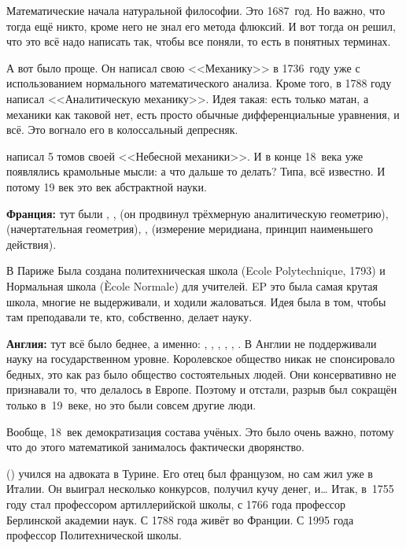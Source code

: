 \documentclass[a4paper,oneside,fleqn,10pt]{article}
\begin{document}
 Математические начала натуральной философии. Это 1687~год.
Но важно, что тогда ещё никто, кроме него не знал его метода флюксий.
И вот тогда он решил, что это всё надо написать так, чтобы все поняли,
то есть в понятных терминах.

А вот  было проще. Он написал свою <<Механику>> в 1736~году уже с использованием
нормального математического анализа. Кроме того, в 1788 году  написал
<<Аналитическую механику>>. Идея такая: есть только матан, а механики как таковой
нет, есть просто обычные дифференциальные уравнения, и всё. Это вогнало его
в колоссальный депресняк.

  написал 5 томов своей <<Небесной механики>>. И в конце 18~века уже
появлялись крамольные мысли: а что дальше то делать? Типа, всё известно.
И потому 19 век это век абстрактной науки.

\textbf{Франция:} тут были , ,  (он продвинул трёхмерную аналитическую геометрию),
 (начертательная геометрия), ,  (измерение меридиана, принцип наименьшего действия).

В Париже Была создана политехническая школа (Ecole Polytechnique, 1793) и Нормальная школа (\`Ecole Normale) для учителей.
EP это была самая крутая школа, многие не выдерживали, и ходили жаловаться.
Идея была в том, чтобы там преподавали те, кто, собственно, делает науку.

\textbf{Англия:} тут всё было беднее, а именно: , , , ,
, .
В Англии не поддерживали науку на государственном уровне. Королевское общество никак не спонсировало бедных,
это как раз было общество состоятельных людей.
Они консервативно не признавали то, что делалось в Европе. Поэтому и отстали, разрыв
был сокращён только в~19~веке, но это были совсем другие люди.

Вообще, 18~век демократизация состава учёных.  Это было очень важно, потому что до этого
математикой занималось фактически дворянство.

 () учился на адвоката в Турине. Его отец был французом, но
сам жил уже в Италии. Он выиграл несколько конкурсов, получил кучу денег, и\ldots
Итак, в~1755 году стал профессором артиллерийской школы, с 1766 года профессор Берлинской
академии наук. С 1788 года живёт во Франции. С 1995 года профессор Политехнической
школы.
\end{document}
